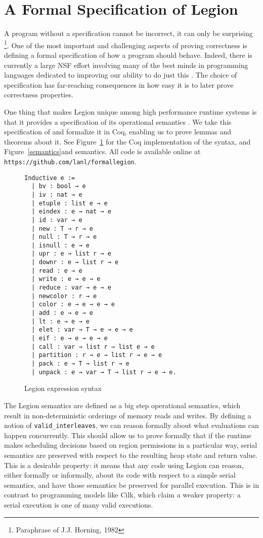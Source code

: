 \documentclass[sigconf]{acmart}
\begin{document}
\section{A Formal Specification of Legion}

A program without a specification cannot be incorrect, it can only be
surprising \footnote{Paraphrase of J.J. Horning, 1982}. One of the most
important and challenging aspects of proving correctness is defining a formal
specification of how a program should behave. Indeed, there is currently a
large NSF effort involving many of the best minds in programming languages
dedicated to improving our ability to do just this \cite{weng2016deepspec}. The choice
of specification has far-reaching consequences in how easy it is to later prove
correctness properties. 

One thing that makes Legion unique among high performance runtime systems is
that it provides a specification of its operational semantics \cite{treichler2013language}.
We take this specification of and formalize it in Coq, enabling us to prove
lemmas and theorems about it. See Figure~\ref{syntax} for the Coq
implementation of the syntax, and Figure~\ref{semantics}and semantics. All code
is available online at \texttt{https://github.com/lanl/formallegion}. 

\begin{figure}
\centering
\begin{BVerbatim}
Inductive e :=
  | bv : bool → e
  | iv : nat → e
  | etuple : list e → e
  | eindex : e → nat → e
  | id : var → e
  | new : T → r → e
  | null : T → r → e
  | isnull : e → e
  | upr : e → list r → e
  | downr : e → list r → e
  | read : e → e 
  | write : e → e → e
  | reduce : var → e → e
  | newcolor : r → e
  | color : e → e → e → e
  | add : e → e → e
  | lt : e → e → e
  | elet : var → T → e → e → e
  | eif : e → e → e → e
  | call : var → list r → list e → e
  | partition : r → e → list r → e → e
  | pack : e → T → list r → e
  | unpack : e → var → T → list r → e → e.
\end{BVerbatim}
\caption{Legion expression syntax}
\label{syntax}
\end{figure}

The Legion semantics are defined as a big step operational semantics, which
result in non-deterministic orderings of memory reads and writes. By defining a
notion of \texttt{valid\_interleaves}, we can reason formally about what evaluations 
can happen concurrently. This should allow us to prove formally that if the
runtime makes scheduling decisions based on region permissions in a particular
way, serial semantics are preserved with respect to the resulting heap state
and return value. This is a desirable property: it means that any code using
Legion can reason, either formally or informally, about its code with respect
to a simple serial semantics, and have those semantics be preserved for
parallel execution. This is in contrast to programming models like Cilk, which
claim a weaker property: a serial execution is one of many valid executions. 
\end{document}
